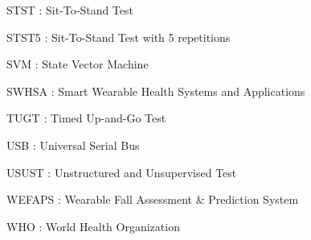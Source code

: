 {\begin{abbrv}
        \item[STST]            : Sit-To-Stand Test
        \item[STST5]           : Sit-To-Stand Test with 5 repetitions
        \item[SVM]             : State Vector Machine
        \item[SWHSA]           : Smart Wearable Health Systems and Applications
        \item[TUGT]            : Timed Up-and-Go Test
        \item[USB]             : Universal Serial Bus
        \item[USUST]           : Unstructured and Unsupervised Test
        \item[WEFAPS]          : Wearable Fall Assessment \& Prediction System
        \item[WHO]             : World Health Organization
    \end{abbrv}
    
}